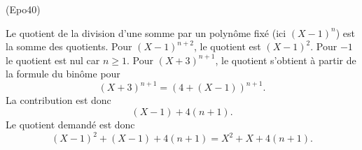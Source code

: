\begin{tiny}(Epo40)\end{tiny} Le quotient de la division d'une somme par un polynôme fixé (ici $(X-1)^n$) est la somme des quotients. Pour $(X-1)^{n+2}$, le quotient est $(X-1)^2$.\newline
Pour $-1$ le quotient est nul car $n\geq 1$.\newline
Pour $(X+3)^{n+1}$, le quotient s'obtient à partir de la formule du binôme pour 
\[
  (X+3)^{n+1} = \left(4 + (X-1)\right)^{n+1}.
\]
La contribution est donc
\[
  (X-1) + 4(n+1).
\]
Le quotient demandé est donc
\[
  (X-1)^2 + (X-1) + 4(n+1) = X^2 + X +4(n+1).
\]
